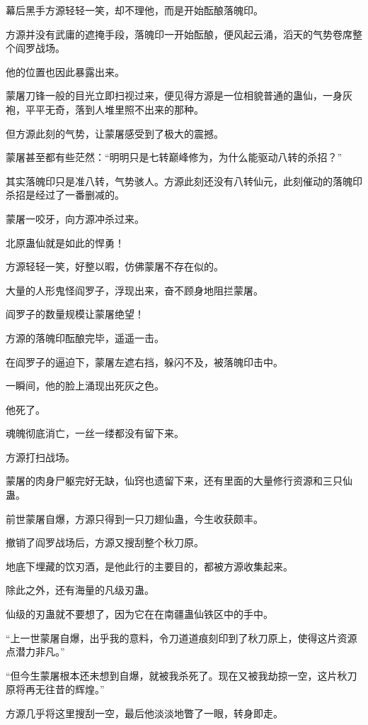 \begin{this_body}
幕后黑手方源轻轻一笑，却不理他，而是开始酝酿落魄印。

方源并没有武庸的遮掩手段，落魄印一开始酝酿，便风起云涌，滔天的气势卷席整个阎罗战场。

他的位置也因此暴露出来。

蒙屠刀锋一般的目光立即扫视过来，便见得方源是一位相貌普通的蛊仙，一身灰袍，平平无奇，落到人堆里照不出来的那种。

但方源此刻的气势，让蒙屠感受到了极大的震撼。

蒙屠甚至都有些茫然：“明明只是七转巅峰修为，为什么能驱动八转的杀招？”

其实落魄印只是准八转，气势骇人。方源此刻还没有八转仙元，此刻催动的落魄印杀招是经过了一番删减的。

蒙屠一咬牙，向方源冲杀过来。

北原蛊仙就是如此的悍勇！

方源轻轻一笑，好整以暇，仿佛蒙屠不存在似的。

大量的人形鬼怪阎罗子，浮现出来，奋不顾身地阻拦蒙屠。

阎罗子的数量规模让蒙屠绝望！

方源的落魄印酝酿完毕，遥遥一击。

在阎罗子的逼迫下，蒙屠左遮右挡，躲闪不及，被落魄印击中。

一瞬间，他的脸上涌现出死灰之色。

他死了。

魂魄彻底消亡，一丝一缕都没有留下来。

方源打扫战场。

蒙屠的肉身尸躯完好无缺，仙窍也遗留下来，还有里面的大量修行资源和三只仙蛊。

前世蒙屠自爆，方源只得到一只刀翅仙蛊，今生收获颇丰。

撤销了阎罗战场后，方源又搜刮整个秋刀原。

地底下埋藏的饮刃酒，是他此行的主要目的，都被方源收集起来。

除此之外，还有海量的凡级刃蛊。

仙级的刃蛊就不要想了，因为它在在南疆蛊仙铁区中的手中。

“上一世蒙屠自爆，出乎我的意料，令刀道道痕刻印到了秋刀原上，使得这片资源点潜力非凡。”

“但今生蒙屠根本还未想到自爆，就被我杀死了。现在又被我劫掠一空，这片秋刀原将再无往昔的辉煌。”

方源几乎将这里搜刮一空，最后他淡淡地瞥了一眼，转身即走。


\end{this_body}
